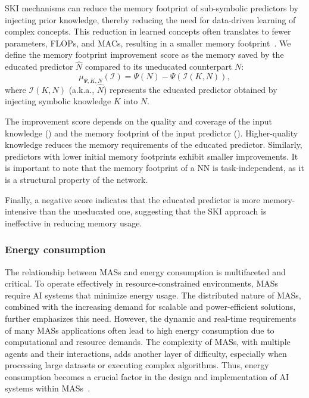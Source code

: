 %
\Gls{SKI} mechanisms can reduce the memory footprint of sub-symbolic predictors by injecting prior knowledge, thereby reducing the need for data-driven learning of complex concepts.
%
This reduction in learned concepts often translates to fewer parameters, \glspl{FLOP}, and \glspl{MAC}, resulting in a smaller memory footprint~\cite{CITATION}.
%
We define the memory footprint improvement score as the memory saved by the educated predictor \(\hat{N}\) compared to its uneducated counterpart \(N\):
%
\begin{equation}
    \label{eq:memory-footprint-improvement-score}
    \mu_{\Psi, K, N}(\mathcal{I}) = \Psi(N) - \Psi(\mathcal{I}(K, N)),
\end{equation}
%
where \(\mathcal{I}(K, N)\) (a.k.a., $\hat{N}$) represents the educated predictor obtained by injecting symbolic knowledge \(K\) into \(N\).

%
The improvement score depends on the quality and coverage of the input knowledge () and the memory footprint of the input predictor ().
%
Higher-quality knowledge reduces the memory requirements of the educated predictor.
%
Similarly, predictors with lower initial memory footprints exhibit smaller improvements.
%
It is important to note that the memory footprint of a \gls{NN} is task-independent, as it is a structural property of the network.

%
Finally, a negative score indicates that the educated predictor is more memory-intensive than the uneducated one, suggesting that the \gls{SKI} approach is ineffective in reducing memory usage.


\subsubsection{Energy consumption}\label{subsubsec:ski-meets-intelligent-agents-energy-consumption}
%
The relationship between \glspl{MAS} and energy consumption is multifaceted and critical.
%
To operate effectively in resource-constrained environments, \glspl{MAS} require \gls{AI} systems that minimize energy usage.
%
The distributed nature of \glspl{MAS}, combined with the increasing demand for scalable and power-efficient solutions, further emphasizes this need.
%
However, the dynamic and real-time requirements of many \glspl{MAS} applications often lead to high energy consumption due to computational and resource demands.
%
The complexity of \glspl{MAS}, with multiple agents and their interactions, adds another layer of difficulty, especially when processing large datasets or executing complex algorithms.
%
Thus, energy consumption becomes a crucial factor in the design and implementation of \gls{AI} systems within \glspl{MAS}~\cite{CITATION}.

